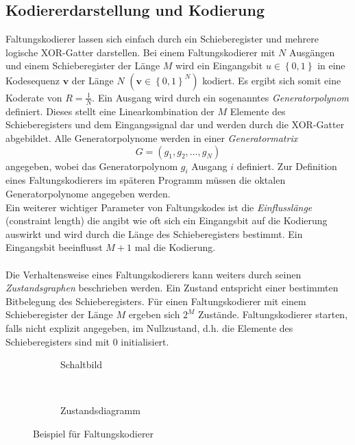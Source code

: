 \subsection{Kodiererdarstellung und Kodierung}
\label{kapitel:grundlagen_darstellung}
Faltungskodierer lassen sich einfach durch ein Schieberegister und mehrere logische XOR-Gatter darstellen. Bei einem Faltungskodierer mit $N$ Ausgängen und einem Schieberegister der Länge $M$ wird ein Eingangsbit $u \in \left\lbrace 0,1 \right\rbrace$ in eine Kodesequenz $\mathbf{v}$ der Länge $N$ $\left( \mathbf{v} \in {\left\lbrace 0,1\right\rbrace }^{N}\right)$ kodiert. Es ergibt sich somit eine Koderate von $R=\frac{1}{N}$. Ein Ausgang wird durch ein sogenanntes \emph{Generatorpolynom} definiert. Dieses stellt eine Linearkombination der $M$ Elemente des Schieberegisters und dem Eingangssignal dar und werden durch die XOR-Gatter abgebildet. Alle Generatorpolynome werden in einer \emph{Generatormatrix}
\begin{equation}
G=\left( g_{1}, g_{2},\dots , g_{N} \right) 
\end{equation}
angegeben, wobei das Generatorpolynom $g_{i}$ Ausgang $i$ definiert. Zur Definition eines Faltungskodierers im späteren Programm müssen die oktalen Generatorpolynome angegeben werden.
\\
Ein weiterer wichtiger Parameter von Faltungskodes ist die \emph{Einflusslänge} (constraint length) die angibt wie oft sich ein Eingangsbit auf die Kodierung auswirkt und wird durch die Länge des Schieberegisters bestimmt. Ein Eingangsbit beeinflusst $M+1$ mal die Kodierung.
\\
\\
Die Verhaltensweise eines Faltungskodierers kann weiters durch seinen \emph{Zustandsgraphen} beschrieben werden. Ein Zustand entspricht einer bestimmten Bitbelegung des Schieberegisters. Für einen Faltungskodierer mit einem Schieberegister der Länge $M$ ergeben sich $2^{M}$ Zustände. Faltungskodierer starten, falls nicht explizit angegeben, im Nullzustand, d.h. die Elemente des Schieberegisters sind mit 0 initialisiert.
\begin{figure}[t]
	\centering
	\begin{subfigure}{0.65\textwidth}
		\centering
		\resizebox{0.99\textwidth}{!}{%
			
		}
		\caption{Schaltbild}
	\end{subfigure}
	~ %
	\begin{subfigure}{0.3\textwidth}
		\centering
		\resizebox{0.99\textwidth}{!}{%
			
		}
		\caption{Zustandsdiagramm}
	\end{subfigure}
	\caption{Beispiel für Faltungskodierer}
	\label{abb:standardkodierer}
\end{figure}
